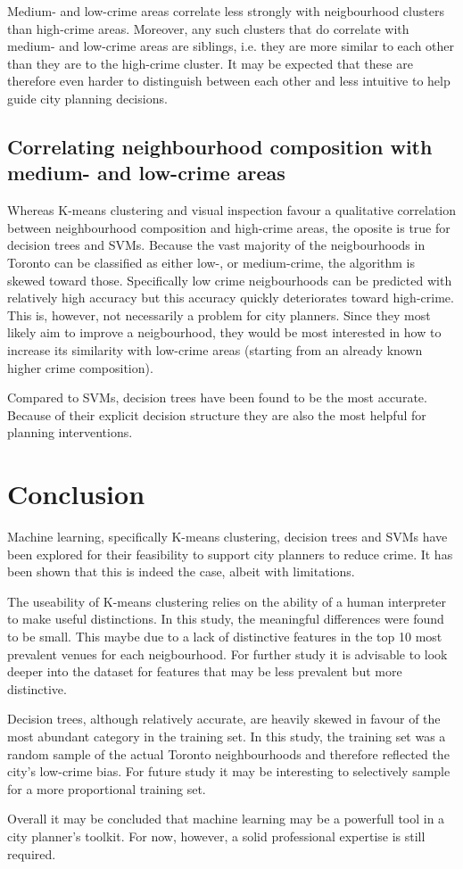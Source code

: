 \documentclass{article}
\begin{document}
Medium- and low-crime areas correlate less strongly with neigbourhood clusters than high-crime areas. Moreover, any such clusters that do correlate with medium- and low-crime areas are siblings, i.e. they are more similar to each other than they are to the high-crime cluster. It may be expected that these are therefore even harder to distinguish between each other and less intuitive to help guide city planning decisions.

\subsection{Correlating neighbourhood composition with medium- and low-crime areas}
Whereas K-means clustering and visual inspection favour a qualitative correlation between neighbourhood composition and high-crime areas, the oposite is true for decision trees and SVMs. Because the vast majority of the neigbourhoods in Toronto can be classified as either low-, or medium-crime, the algorithm is skewed toward those. Specifically low crime neigbourhoods can be predicted with relatively high accuracy but this accuracy quickly deteriorates toward high-crime. This is, however, not necessarily a problem for city planners. Since they most likely aim to improve a neigbourhood, they would be most  interested in how to increase its similarity with low-crime areas (starting from an already known higher crime composition). 

Compared to SVMs, decision trees have been found to be the most accurate. Because of their explicit decision structure they are also the most helpful for planning interventions.

\section{Conclusion}
Machine learning, specifically K-means clustering, decision trees and SVMs have been explored for their feasibility to support city planners to reduce crime. It has been shown that this is indeed the case, albeit with limitations.

The useability of K-means clustering relies on the ability of a human interpreter to make useful distinctions. In this study, the meaningful differences were found to be small. This maybe due to a lack of distinctive features in the top 10 most prevalent venues for each neigbourhood. For further study it is advisable to look deeper into the dataset for features that may be less prevalent but more distinctive.

Decision trees, although relatively accurate, are heavily skewed in favour of the most abundant category in the training set. In this study, the training set was a random sample of the actual Toronto neighbourhoods and therefore reflected the city's low-crime bias. For future study it may be interesting to selectively sample for a more proportional training set.

Overall it may be concluded that machine learning may be a powerfull tool in a city planner's toolkit. For now, however, a solid professional expertise is still required.
 
\end{document}
